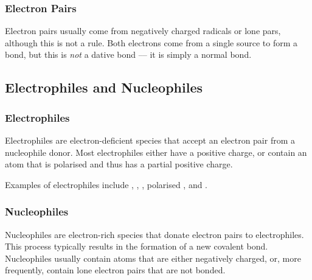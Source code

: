 	\subsubsection{Electron Pairs}

		Electron pairs usually come from negatively charged radicals or lone pars, although this is not a rule.
		Both electrons come from a single source to form a bond, but this is \textit{not} a dative bond –– it is simply a normal
		bond.





\pagebreak %

\subsection{Electrophiles and Nucleophiles}
	\subsubsection{Electrophiles}

		Electrophiles are electron-deficient species that accept an electron pair from a nucleophile donor. Most electrophiles
		either have a positive charge, or contain an atom that is polarised and thus has a partial positive charge.

		Examples of electrophiles include , , , polarised , and .


	\subsubsection{Nucleophiles}

		Nucleophiles are electron-rich species that donate electron pairs to electrophiles. This process typically results
		in the formation of a new covalent bond. Nucleophiles usually contain atoms that are either negatively charged, or,
		more frequently, contain lone electron pairs that are not bonded.

